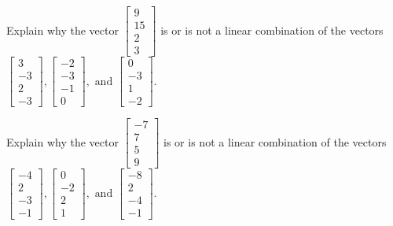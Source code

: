 \documentclass{article}
\begin{document}
\begin{exerciseStatement}
    Explain why the vector \(\left[\begin{array}{c}
9 \\
15 \\
2 \\
3
\end{array}\right]\)  is or is not a linear
combination of the vectors \(\left[\begin{array}{c}
3 \\
-3 \\
2 \\
-3
\end{array}\right] , \left[\begin{array}{c}
-2 \\
-3 \\
-1 \\
0
\end{array}\right] , \text{ and } \left[\begin{array}{c}
0 \\
-3 \\
1 \\
-2
\end{array}\right]\).



  
\end{exerciseStatement}

\begin{exerciseStatement}
    Explain why the vector \(\left[\begin{array}{c}
-7 \\
7 \\
5 \\
9
\end{array}\right]\)  is or is not a linear
combination of the vectors \(\left[\begin{array}{c}
-4 \\
2 \\
-3 \\
-1
\end{array}\right] , \left[\begin{array}{c}
0 \\
-2 \\
2 \\
1
\end{array}\right] , \text{ and } \left[\begin{array}{c}
-8 \\
2 \\
-4 \\
-1
\end{array}\right]\).



  
\end{exerciseStatement}
\end{document}
